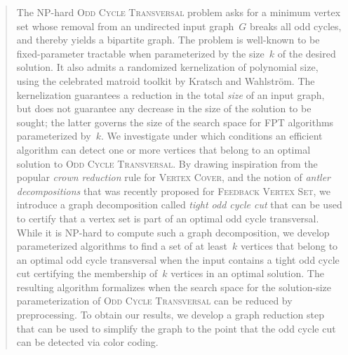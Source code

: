 \begin{abstract}
  The NP-hard \textsc{Odd Cycle Transversal} problem asks for a minimum vertex set whose removal from an undirected input graph~$G$ breaks all odd cycles, and thereby yields a bipartite graph. The problem is well-known to be fixed-parameter tractable when parameterized by the size~$k$ of the desired solution. It also admits a randomized kernelization of polynomial size, using the celebrated matroid toolkit by Kratsch and Wahlstr\"{o}m. The kernelization guarantees a reduction in the total \emph{size} of an input graph, but does not guarantee any decrease in the size of the solution to be sought; the latter governs the size of the search space for FPT algorithms parameterized by~$k$. We investigate under which conditions an efficient algorithm can detect one or more vertices that belong to an optimal solution to \textsc{Odd Cycle Transversal}. By drawing inspiration from the popular \emph{crown reduction} rule for \textsc{Vertex Cover}, and the notion of \emph{antler decompositions} that was recently proposed for \textsc{Feedback Vertex Set}, we introduce a graph decomposition called \emph{tight odd cycle cut} that can be used to certify that a vertex set is part of an optimal odd cycle transversal. While it is NP-hard to compute such a graph decomposition, we develop parameterized algorithms to find a set of at least~$k$ vertices that belong to an optimal odd cycle transversal when the input contains a tight odd cycle cut certifying the membership of~$k$ vertices in an optimal solution. The resulting algorithm formalizes when the search space for the solution-size parameterization of \textsc{Odd Cycle Transversal} can be reduced by preprocessing. To obtain our results, we develop a graph reduction step that can be used to simplify the graph to the point that the odd cycle cut can be detected via color coding.
\end{abstract}
  
